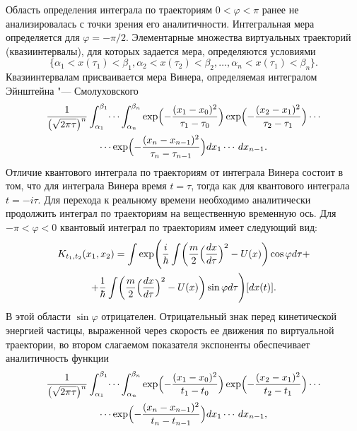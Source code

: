  Область определения интеграла по траекториям $0<\varphi<\pi$ ранее не анализировалась с точки зрения его аналитичности. Интегральная мера определяется для $\varphi={-\pi/2}$. Элементарные множества виртуальных траекторий (квазиинтервалы), для которых задается мера, определяются условиями
 \begin{equation}\label{eq:math:ex5}
   \bigl\{\alpha_{1}<x(\tau_{1})<\beta_{1},\alpha_{2}<x(\tau_{2})<\beta_{2},\dots,\alpha_{n}<x(\tau_{1})<\beta_{n}\bigr\}.
\end{equation}
Квазиинтервалам присваивается мера Винера, определяемая интегралом Эйнштейна "--- Смолуховского~\cite{bib:KPT}
\begin{multline}\label{eq:math:ex6}
\frac{1}{\bigl(\sqrt{2\pi\tau}\bigr)^{n}}\int_{\alpha_{1}}^{\beta_{1}}\dots
\int_{\alpha_{n}}^{\beta_{n}}
\exp\Bigl(-\frac{(x_{1}-x_{0})^{2}}{\tau_{1}-\tau_{0}}\Bigr)
\exp\Bigl(-\frac{(x_{2}-x_{1})^{2}}{\tau_{2}-\tau_{1}}\Bigr)
\cdots\\
\cdots\exp\Bigl(-\frac{(x_{n}-x_{n-1})^{2}}{\tau_{n}-\tau_{n-1}}\Bigr)dx_{1}\cdots\,dx_{n-1}.
\end{multline}
Отличие квантового интеграла по траекториям от интеграла Винера состоит в том, что для интеграла Винера время $t=\tau$, тогда как для квантового интеграла $t=-i\tau$. Для перехода к реальному времени необходимо аналитически продолжить интеграл по траекториям на вещественную временную ось. Для $-\pi<\varphi<0 $ квантовый интеграл по траекториям имеет следующий вид:
\begin{multline*}
    K_{t_{1},t_{2}}(x_{1},x_{2})=\int \exp\Biggl(\frac{i}{\hbar}\int\biggl(\frac{m}{2}\Bigl(\frac{dx}{d\tau}\Bigr)^{2}-U(x)\biggr)\cos\varphi d\tau+
    \\
    +\frac{1}{\hbar}\int\biggl(\frac{m}{2}\Bigl(\frac{dx}{d\tau}\Bigr)^{2}-U(x)\biggr)\sin\varphi d\tau\Biggr)[dx(t)].
\end{multline*}
В этой области $\sin\varphi$ отрицателен. Отрицательный знак перед кинетической энергией частицы, выраженной через скорость ее движения по виртуальной траектории, во втором слагаемом показателя экспоненты обеспечивает аналитичность функции
\begin{multline}\label{eq:math:ex7}
\frac{1}{\bigl(\sqrt{2\pi\tau}\bigr)^{n}}\int_{\alpha_{1}}^{\beta_{1}}\dots
\int_{\alpha_{n}}^{\beta_{n}}
\exp\Bigl(-\frac{(x_{1}-x_{0})^{2}}{t_{1}-t_{0}}\Bigr)
\exp\Bigl(-\frac{(x_{2}-x_{1})^{2}}{t_{2}-t_{1}}\Bigr)
\cdots\\
\cdots
\exp\Bigl(-\frac{(x_{n}-x_{n-1})^{2}}{t_{n}-t_{n-1}}\Bigr)dx_{1}\cdots\,dx_{n-1},
\end{multline}
